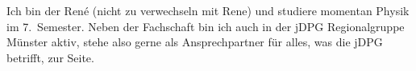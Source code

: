 \begin{multicols*}{2}
{Ich bin der René (nicht zu verwechseln mit Rene) und studiere momentan Physik im 7.~Semester.
	Neben der Fachschaft bin ich auch in der jDPG Regionalgruppe Münster aktiv, stehe also gerne als Ansprechpartner für alles, was die jDPG betrifft, zur Seite.
	\vspace{\baselineskip}}


\end{multicols*}
